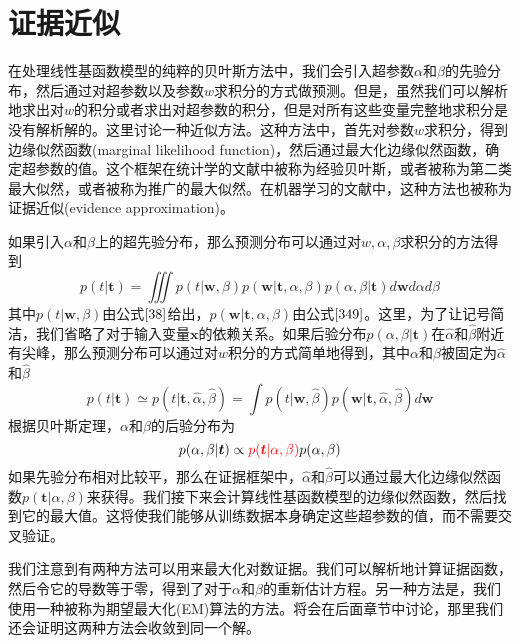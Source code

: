 \section{证据近似}
在处理线性基函数模型的纯粹的贝叶斯方法中，我们会引入超参数$\alpha$和$\beta$的先验分布，然后通过对超参数以及参数$w$求积分的方式做预测。但是，虽然我们可以解析地求出对$w$的积分或者求出对超参数的积分，但是对所有这些变量完整地求积分是没有解析解的。这里讨论一种近似方法。这种方法中，首先对参数$w$求积分，得到边缘似然函数(marginal likelihood function)，然后通过最大化边缘似然函数，确定超参数的值。这个框架在统计学的文献中被称为经验贝叶斯，或者被称为第二类最大似然，或者被称为推广的最大似然。在机器学习的文献中，这种方法也被称为证据近似(evidence approximation)。

如果引入$\alpha$和$\beta$上的超先验分布，那么预测分布可以通过对$w,\alpha,\beta$求积分的方法得到 
\begin{equation}
	p(t|\boldsymbol{t})=\iiint p(t|\boldsymbol{w},\beta)p(\boldsymbol{w}|\boldsymbol{t},\alpha,\beta)p(\alpha,\beta|\boldsymbol{t})d\boldsymbol{w}d\alpha d\beta
\end{equation}
其中$p(t|\boldsymbol{w},\beta)$由公式$\ref{38}$给出，$p(\boldsymbol{w}|\boldsymbol{t},\alpha,\beta)$由公式$\ref{349}$。这里，为了让记号简洁，我们省略了对于输入变量$\boldsymbol{x}$的依赖关系。如果后验分布$p(\alpha,\beta|\boldsymbol{t})$在$\hat{\alpha}$和$\hat{\beta}$附近有尖峰，那么预测分布可以通过对$w$积分的方式简单地得到，其中$\alpha$和$\beta$被固定为$\hat{\alpha}$和$\hat{\beta}$
\begin{equation}
	p(t|\boldsymbol{t})\simeq p(t|\boldsymbol{t},\hat{\alpha},\hat{\beta})=\int p(t|\boldsymbol{w},\hat{\beta})p(\boldsymbol{w}|\boldsymbol{t},\hat{\alpha},\hat{\beta})d\boldsymbol{w}
\end{equation}
根据贝叶斯定理，$\alpha$和$\beta$的后验分布为
\begin{equation}
	p(\alpha,\beta|\boldsymbol{t})\propto {\color{red}{p(\boldsymbol{t}|\alpha,\beta)}}p(\alpha,\beta)
\end{equation}
如果先验分布相对比较平，那么在证据框架中，$\hat{\alpha}$和$\hat{\beta}$可以通过最大化边缘似然函数$p(\boldsymbol{t}|\alpha,\beta)$来获得。我们接下来会计算线性基函数模型的边缘似然函数，然后找到它的最大值。这将使我们能够从训练数据本身确定这些超参数的值，而不需要交叉验证。

我们注意到有两种方法可以用来最大化对数证据。我们可以解析地计算证据函数，然后令它的导数等于零，得到了对于$\alpha$和$\beta$的重新估计方程。另一种方法是，我们使用一种被称为期望最大化(EM)算法的方法。将会在后面章节中讨论，那里我们还会证明这两种方法会收敛到同一个解。

